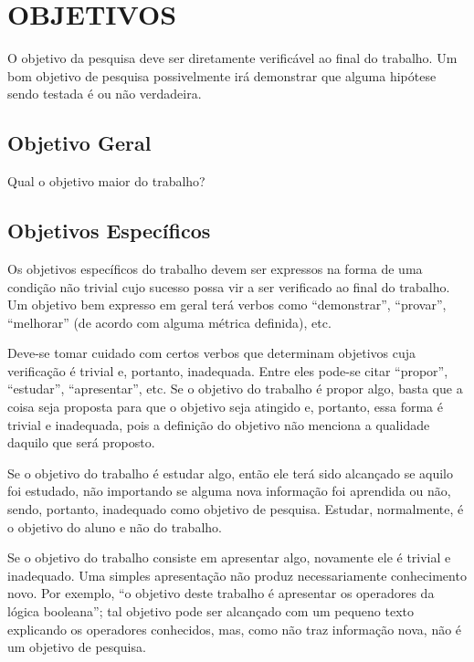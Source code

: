 \documentclass[
    12pt,				       %
    openright,			       %
    oneside,			       %
    a4paper,			       %
    chapter=TITLE,             %
    sumario=tradicional,       %
    english,			        %
    brazil, 				    %
 ]{abntex2}
\begin{document}
\section{\MakeUppercase{Objetivos}}\label{sec:objetivos}
O objetivo da pesquisa deve ser diretamente verificável ao final do trabalho. Um bom objetivo de pesquisa possivelmente irá demonstrar que alguma hipótese sendo testada é ou não verdadeira.


\subsection{Objetivo Geral}\label{sec:ObjGeral}
Qual o objetivo maior do trabalho?

\subsection{Objetivos Específicos}\label{sec:ObjEspec}
Os objetivos específicos do trabalho devem ser expressos na forma de uma condição não trivial cujo sucesso possa vir a ser verificado ao final do trabalho. Um objetivo bem expresso em geral terá verbos como “demonstrar”, “provar”, “melhorar” (de acordo com alguma métrica definida), etc.

Deve-se tomar cuidado com certos verbos que determinam objetivos cuja verificação é trivial e, portanto, inadequada. Entre eles pode-se citar “propor”, “estudar”, “apresentar”, etc. Se o objetivo do trabalho é propor algo, basta que a coisa seja proposta para que o objetivo seja atingido e, portanto, essa forma é trivial e inadequada, pois a definição do objetivo não menciona a qualidade daquilo que será proposto.

Se o objetivo do trabalho é estudar algo, então ele terá sido alcançado se aquilo foi estudado, não importando se alguma nova informação foi aprendida ou não, sendo, portanto, inadequado como objetivo de pesquisa. Estudar, normalmente, é o objetivo do aluno e não do trabalho.

Se o objetivo do trabalho consiste em apresentar algo, novamente ele é trivial e inadequado. Uma simples apresentação não produz necessariamente conhecimento novo. Por exemplo, “o objetivo deste trabalho é apresentar os operadores da lógica booleana”; tal objetivo pode ser alcançado com um pequeno texto explicando os operadores conhecidos, mas, como não traz informação nova, não é um objetivo de pesquisa.
\end{document}
